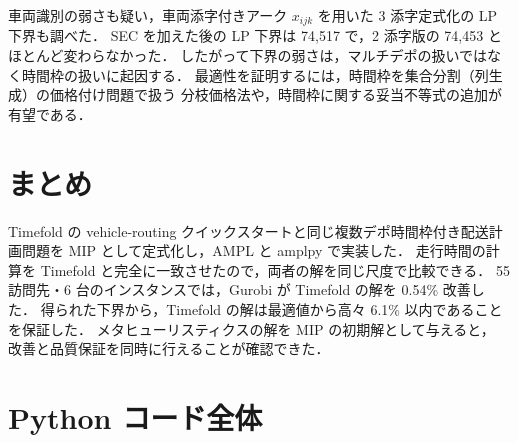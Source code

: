 \documentclass[11pt,a4paper]{ltjsarticle}
\begin{document}
車両識別の弱さも疑い，車両添字付きアーク $x_{ijk}$ を用いた 3 添字定式化の LP 下界も調べた．
SEC を加えた後の LP 下界は 74,517 で，2 添字版の 74,453 とほとんど変わらなかった．
したがって下界の弱さは，マルチデポの扱いではなく時間枠の扱いに起因する．
最適性を証明するには，時間枠を集合分割（列生成）の価格付け問題で扱う
分枝価格法や，時間枠に関する妥当不等式の追加が有望である．

\section{まとめ}

Timefold の vehicle-routing クイックスタートと同じ複数デポ時間枠付き配送計画問題を
MIP として定式化し，AMPL と amplpy で実装した．
走行時間の計算を Timefold と完全に一致させたので，両者の解を同じ尺度で比較できる．
55 訪問先・6 台のインスタンスでは，Gurobi が Timefold の解を 0.54\% 改善した．
得られた下界から，Timefold の解は最適値から高々 6.1\% 以内であることを保証した．
メタヒューリスティクスの解を MIP の初期解として与えると，
改善と品質保証を同時に行えることが確認できた．

\appendix
\section{Python コード全体}


\end{document}
